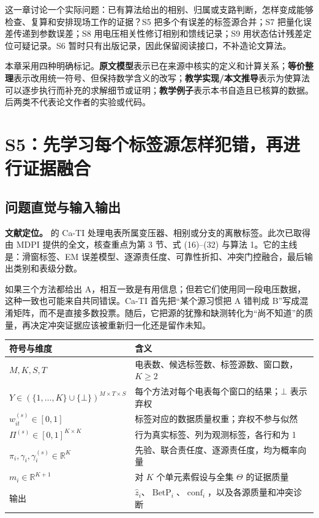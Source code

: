 \documentclass[UTF8,11pt,fontset=fandol,openany,oneside]{ctexbook}
\newcommand{\R}{\mathbb{R}}
\theoremstyle{definition}
\theoremstyle{remark}
\numberwithin{equation}{chapter}
\begin{document}
这一章讨论一个实际问题：已有算法给出的相别、归属或支路判断，怎样变成能够检查、复算和安排现场工作的证据？S5 把多个有误差的标签源合并；S7 把量化误差传递到参数误差；S8 用电压相关性修订相别和馈线记录；S9 用状态估计残差定位可疑记录。S6 暂时只有出版记录，因此保留阅读接口，不补造论文算法。

本章采用四种明确标记。\textbf{原文模型}表示已在来源中核实的定义和计算关系；\textbf{等价整理}表示改用统一符号、但保持数学含义的改写；\textbf{教学实现/本文推导}表示为使算法可以逐步执行而补充的求解细节或证明；\textbf{教学例子}表示本书自造且已核算的数据。后两类不代表论文作者的实验或代码。

\section{S5：先学习每个标签源怎样犯错，再进行证据融合}
\label{sec:dq_s5}

\subsection{问题直觉与输入输出}

\textbf{文献定位。}\citet{S5} 的 Ca-TI 处理电表所属变压器、相别或分支的离散标签。此次已取得由 MDPI 提供的全文，核查重点为第 3 节、式 (16)--(32) 与算法 1。它的主线是：滑窗标签、EM 误差模型、逐源责任度、可靠性折扣、冲突门控融合，最后输出类别和表级分数。

如果三个方法都给出 A，相互一致是有用信息；但若它们使用同一段电压数据，这种一致也可能来自共同错误。Ca-TI 首先把“某个源习惯把 A 错判成 B”写成混淆矩阵，而不是直接多数投票。随后，它把源的犹豫和缺测转化为“尚不知道”的质量，再决定冲突证据应该被重新归一化还是留作未知。

\begin{center}
\begin{tabularx}{\textwidth}{@{}lX@{}}
\toprule
符号与维度 & 含义 \\
\midrule
$M,K,S,T$ & 电表数、候选标签数、标签源数、窗口数，$K\ge2$ \\
$Y\in(\{1,\ldots,K\}\cup\{\bot\})^{M\times T\times S}$ & 每个方法对每个电表每个窗口的结果；$\bot$ 表示弃权 \\
$w_{it}^{(s)}\in[0,1]$ & 标签对应的数据质量权重；弃权不参与似然 \\
$\Pi^{(s)}\in[0,1]^{K\times K}$ & 行为真实标签、列为观测标签，各行和为 1 \\
$\pi_i,\gamma_i,\gamma_i^{(s)}\in\R^K$ & 先验、联合责任度、逐源责任度，均为概率向量 \\
$m_i\in\R^{K+1}$ & 对 $K$ 个单元素假设与全集 $\Theta$ 的证据质量 \\
输出 & $\hat z_i$、$\operatorname{BetP}_i$、$\operatorname{conf}_i$，以及各源质量和冲突诊断 \\
\bottomrule
\end{tabularx}
\end{center}
\end{document}
